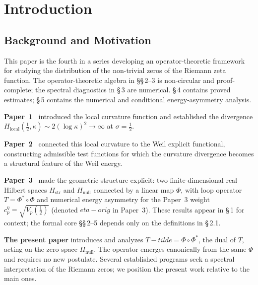 \documentclass[11pt]{article}
\def\Tt{T-tilde}%
\def\etaorig{eta-orig}%
\newcommand{\Hstr}{H_{\mathrm{str}}}
\newcommand{\Hnull}{H_{\mathrm{null}}}
\newcommand{\etaorig}{\eta_{\mathrm{orig}}}
\newcommand{\Tt}{\widetilde{T}}
\begin{document}
\newpage

\section{Introduction}

\subsection{Background and Motivation}

This paper is the fourth in a series developing an operator-theoretic
framework for studying the distribution of the non-trivial zeros of
the Riemann zeta function. The operator-theoretic algebra in \S\S\,2--3
is non-circular and proof-complete; the spectral diagnostics in \S\,3
are numerical. \S\,4 contains proved estimates;
\S\,5 contains the numerical and conditional energy-asymmetry analysis.

\textbf{Paper~1}~\cite{Paper1} introduced the local curvature function and
established the divergence
$H_{\mathrm{local}}(\tfrac{1}{2},\kappa)\sim 2(\log\kappa)^2\to\infty$
at $\sigma=\tfrac{1}{2}$.

\textbf{Paper~2}~\cite{Paper2} connected this local curvature to the
Weil explicit functional, constructing admissible test functions
for which the curvature divergence becomes a structural feature of
the Weil energy.

\textbf{Paper~3}~\cite{Paper3} made the geometric structure explicit: two
finite-dimensional real Hilbert spaces $\Hstr$ and $\Hnull$ connected
by a linear map $\Phi$, with loop operator $T = \Phi^*\circ\Phi$ and
numerical energy asymmetry for the Paper~3 weight
$c_p^\eta=\sqrt{V_p(\tfrac12)}$ (denoted $\etaorig$ in Paper~3).
These results appear in \S\,1 for context; the formal core
\S\S\,2--5 depends only on the definitions in \S\,2.1.

\textbf{The present paper} introduces and analyzes $\Tt = \Phi\circ\Phi^*$,
the dual of $T$, acting on the zero space $\Hnull$. The operator
emerges canonically from the same $\Phi$ and requires no new
postulate. Several established programs seek a spectral interpretation
of the Riemann zeros; we position the present work relative to the
main ones.
\end{document}
